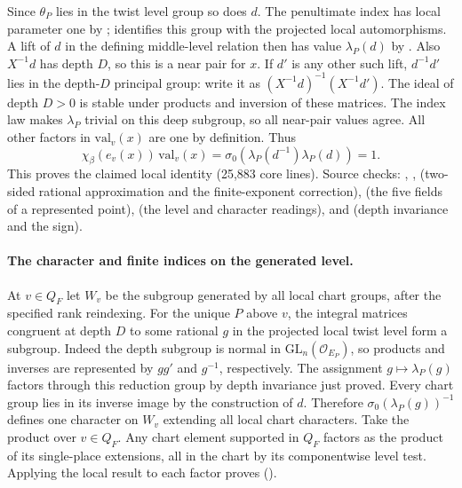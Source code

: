 Since $\theta_P$ lies in the twist level group so does $d$.
The penultimate index has local parameter one by ;
 identifies this group with the projected local
automorphisms. A lift of $d$ in the defining middle-level relation
then has value $\lambda_P(d)$ by . Also $X^{-1}d$ has
depth $D$, so this is a near pair for $x$. If $d'$ is any other such
lift, $d^{-1}d'$ lies in the depth-$D$ principal group: write it as
$(X^{-1}d)^{-1}(X^{-1}d')$. The ideal of depth $D>0$ is stable under
products and inversion of these matrices. The index law makes
$\lambda_P$ trivial on this deep subgroup, so all near-pair values agree.
All other factors in $\mathrm{val}_v(x)$ are one by definition. Thus
\[
     \chi_\beta(e_v(x))\,\mathrm{val}_v(x)
       =\sigma_0\!\left(\lambda_P(d^{-1})\lambda_P(d)\right)=1 .
\]
This proves the claimed local identity (25,883 core lines). Source checks:
,
, 
(two-sided rational approximation and the finite-exponent correction),
 (the five fields of
a represented point), 
(the level and character readings), 
and 
(depth invariance and the sign).

\paragraph{The character and finite indices on the generated level.}
At $v\in Q_F$ let $W_v$ be the subgroup generated by all local chart
groups, after the specified rank reindexing. For the unique $P$ above
$v$, the integral matrices congruent at depth $D$ to some rational
$g$ in the projected local twist level form a subgroup. Indeed the
depth subgroup is normal in $\mathrm{GL}_n(\mathcal O_{E_P})$, so
products and inverses are represented by $gg'$ and $g^{-1}$, respectively.
The assignment $g\mapsto\lambda_P(g)$ factors through this reduction
group by depth invariance just proved. Every chart group lies in its
inverse image by the construction of $d$. Therefore
$\sigma_0(\lambda_P(g))^{-1}$ defines one character on $W_v$
extending all local chart characters. Take the product over $v\in Q_F$.
Any chart element supported in $Q_F$ factors as the product of its
single-place extensions, all in the chart by its componentwise level
test. Applying the local result to each factor proves
().

